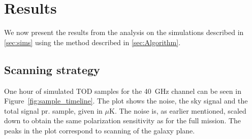\documentclass[twocolumn]{aa}
\begin{document}

\section{Results}
\label{sec:Results}


We now present the results from the analysis on the simulations described in \ref{sec:sims} using the method described in \ref{sec:Algorithm}. 

\subsection{Scanning strategy}
One hour of simulated TOD samples for the 40~GHz channel can be seen in Figure~\ref{fig:sample_timeline}. The plot shows the noise, the sky signal and the total signal pr. sample, given in $\mu$K. The noise is, as earlier mentioned, scaled down to obtain the same polarization sensitivity as for the full mission. The peaks in the plot correspond to scanning of the galaxy plane. 
\end{document}
